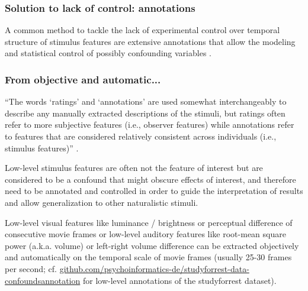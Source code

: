 \pagebreak



\subsubsection{Solution to lack of control: annotations}


%
A common method to tackle the lack of experimental control over temporal
structure of stimulus features are extensive annotations that allow the modeling
and statistical control of possibly confounding variables \citep[e.g., Wagner,
2016, The dorsal medial prefrontal cortex
responds...,][]{deniz2019representation}.


\subsubsection{From objective and automatic...}


``The words ‘ratings’ and ‘annotations’ are used somewhat interchangeably to
describe any manually extracted descriptions of the stimuli, but ratings often
refer to more subjective features (i.e., observer features) while annotations
refer to features that are considered relatively consistent across individuals
(i.e., stimulus features)'' \citep{saarimaki2021naturalistic}.


%
Low-level stimulus features are often not the feature of interest but are
considered to be a confound that might obscure effects of interest, and
therefore need to be annotated and controlled in order to guide the
interpretation of results and allow generalization to other naturalistic
stimuli.

%
Low-level visual features like luminance / brightness or
perceptual difference of consecutive movie frames or low-level auditory features
like root-mean square power (a.k.a. volume) or left-right volume difference can
be extracted objectively and automatically on the temporal scale of movie frames
(usually 25-30 frames per second; cf.
\href{https://github.com/psychoinformatics-de/studyforrest-data-confoundsannotation
}{\url{github.com/psychoinformatics-de/studyforrest-data-confoundsannotation}}
for low-level annotations of the studyforrest dataset).

